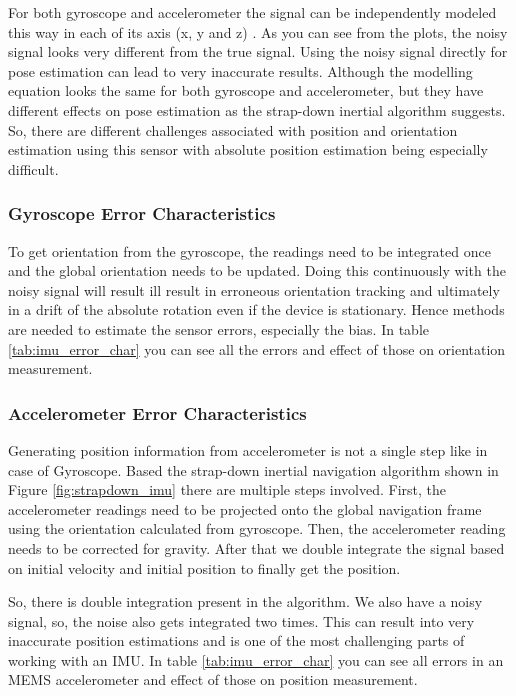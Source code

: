 For both gyroscope and accelerometer the signal can be independently modeled this way in each of its axis (x, y and z) \citep{imu_noise}. As you can see from the plots, the noisy signal looks very different from the true signal. Using the noisy signal directly for pose estimation can lead to very inaccurate results. Although the modelling equation looks the same for both gyroscope and accelerometer, but they have different effects on pose estimation as the strap-down inertial algorithm suggests. So, there are different challenges associated with position and orientation estimation using this sensor with absolute position estimation being especially difficult.

\subsubsection{Gyroscope Error Characteristics}
To get orientation from the gyroscope, the readings need to be integrated once and the global orientation needs to be updated. Doing this continuously with the noisy signal will result ill result in erroneous orientation tracking and ultimately in a drift of the absolute rotation even if the device is stationary. Hence methods are needed to estimate the sensor errors, especially the bias. In table \ref{tab:imu_error_char} you can see all the errors and effect of those on orientation measurement.

\subsubsection{Accelerometer Error Characteristics}
Generating position information from accelerometer is not a single step like in case of Gyroscope. Based the strap-down inertial navigation algorithm shown in Figure \ref{fig:strapdown_imu} there are multiple steps involved. First, the accelerometer readings need to be projected onto the global navigation frame using the orientation calculated from gyroscope. Then, the accelerometer reading needs to be corrected for gravity. After that we double integrate the signal based on initial velocity and initial position to finally get the position.

So, there is double integration present in the algorithm. We also have a noisy signal, so, the noise also gets integrated two times. This can result into very inaccurate position estimations and is one of the most challenging parts of working with an IMU. In table \ref{tab:imu_error_char} you can see all errors in an MEMS accelerometer and effect of those on position measurement.

